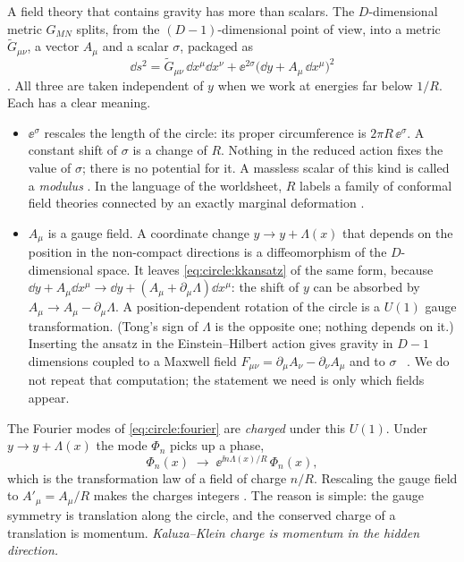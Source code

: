 A field theory that contains gravity has more than scalars. The $D$-dimensional metric
$G_{MN}$ splits, from the $(D-1)$-dimensional point of view, into a metric
$\tilde G_{\mu\nu}$, a vector $A_\mu$ and a scalar $\sigma$, packaged as
\begin{equation}\label{eq:circle:kkansatz}
 \dd s^2=\tilde G_{\mu\nu}\,\dd x^\mu\dd x^\nu+\ee^{2\sigma}\big(\dd y+A_\mu\,\dd x^\mu\big)^2
\end{equation}
. All three are taken independent of $y$ when we
work at energies far below $1/R$. Each has a clear meaning.
\begin{itemize}[leftmargin=*]
\item $\ee^{\sigma}$ rescales the length of the circle: its proper circumference is
$2\pi R\,\ee^{\sigma}$. A constant shift of $\sigma$ is a change of $R$. Nothing in the
reduced action fixes the value of $\sigma$; there is no potential for it. A massless scalar of
this kind is called a \emph{modulus}
. In the language of the worldsheet, $R$ labels a family of
conformal field theories connected by an exactly marginal deformation
.
\item $A_\mu$ is a gauge field. A coordinate change $y\to y+\Lambda(x)$ that depends on the
position in the non-compact directions is a diffeomorphism of the $D$-dimensional space. It
leaves \eqref{eq:circle:kkansatz} of the same form, because
$\dd y+A_\mu\dd x^\mu\to\dd y+(A_\mu+\partial_\mu\Lambda)\dd x^\mu$: the shift of $y$ can be
absorbed by $A_\mu\to A_\mu-\partial_\mu\Lambda$. A position-dependent rotation of the circle
is a $U(1)$ gauge transformation. (Tong's sign of $\Lambda$
is the opposite one; nothing depends on it.) Inserting the ansatz in the Einstein--Hilbert
action gives gravity in $D-1$ dimensions coupled to a Maxwell field
$F_{\mu\nu}=\partial_\mu A_\nu-\partial_\nu A_\mu$ and to $\sigma$ \TL\
. We do not repeat that computation; the statement we need
is only which fields appear.
\end{itemize}
The Fourier modes of \eqref{eq:circle:fourier} are \emph{charged} under this $U(1)$. Under
$y\to y+\Lambda(x)$ the mode $\Phi_n$ picks up a phase,
\begin{equation}\label{eq:circle:kkcharge}
 \Phi_n(x)\;\to\;\ee^{\ii n\Lambda(x)/R}\,\Phi_n(x),
\end{equation}
which is the transformation law of a field of charge $n/R$. Rescaling the gauge field to
$A'_\mu=A_\mu/R$ makes the charges integers \source{Tong §8.1.1, ll.~11336--11349}. The reason
is simple: the gauge symmetry is translation along the circle, and the conserved charge of a
translation is momentum. \emph{Kaluza--Klein charge is momentum in the hidden direction.}

